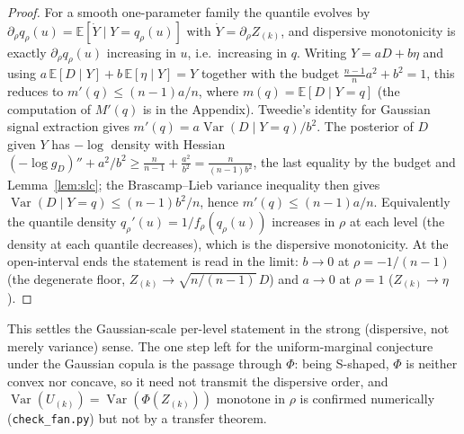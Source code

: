 \documentclass[11pt]{article}
\begin{document}
\begin{proof}
For a smooth one-parameter family the quantile evolves by $\partial_\rho q_\rho(u)=
\mathbb E[\dot Y\mid Y=q_\rho(u)]$ with $\dot Y=\partial_\rho Z_{(k)}$, and dispersive monotonicity is
exactly $\partial_\rho q_\rho(u)$ increasing in $u$, i.e.\ increasing in $q$. Writing
$Y=aD+b\eta$ and using $a\,\mathbb E[D\mid Y]+b\,\mathbb E[\eta\mid Y]=Y$ together with the budget
$\tfrac{n-1}na^2+b^2=1$, this reduces to $m'(q)\le (n-1)a/n$, where $m(q)=\mathbb E[D\mid Y=q]$ (the
computation of $M'(q)$ is in the Appendix).
Tweedie's identity for Gaussian signal extraction gives $m'(q)=a\operatorname{Var}(D\mid Y=q)/b^2$.
The posterior of $D$ given $Y$ has $-\log$ density with Hessian
$(-\log g_D)''+a^2/b^2\ge \tfrac n{n-1}+\tfrac{a^2}{b^2}=\tfrac{n}{(n-1)b^2}$, the last equality by the
budget and Lemma~\ref{lem:slc}; the Brascamp--Lieb variance inequality \citep{brascamplieb1976} then
gives $\operatorname{Var}(D\mid Y=q)\le (n-1)b^2/n$, hence $m'(q)\le (n-1)a/n$. Equivalently the
quantile density $q_\rho'(u)=1/f_\rho(q_\rho(u))$ increases in $\rho$ at each level (the density at each
quantile decreases), which is the dispersive monotonicity. At the open-interval ends the statement is
read in the limit: $b\to0$ at $\rho=-1/(n-1)$ (the degenerate floor, $Z_{(k)}\to\sqrt{n/(n-1)}\,D$) and
$a\to0$ at $\rho=1$ ($Z_{(k)}\to\eta$).
\end{proof}

This settles the Gaussian-scale per-level statement in the strong (dispersive, not merely variance)
sense. The one step left for the uniform-marginal conjecture under the Gaussian copula is the passage
through $\Phi$: being S-shaped, $\Phi$ is neither convex nor concave, so it need not transmit the
dispersive order, and $\operatorname{Var}(U_{(k)})=\operatorname{Var}(\Phi(Z_{(k)}))$ monotone in
$\rho$ is confirmed numerically (\texttt{check\_fan.py}) but not by a transfer theorem.
\end{document}
